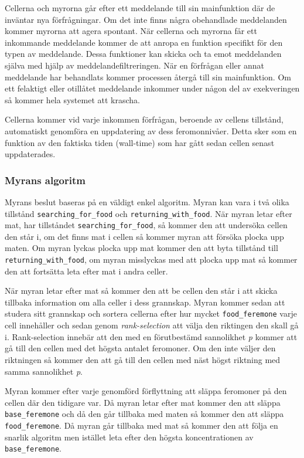 \documentclass[12pt]{article}
\begin{document}
Cellerna och myrorna går efter ett meddelande till sin mainfunktion där de inväntar nya förfrågningar.
Om det inte finns några obehandlade meddelanden kommer myrorna att agera spontant.
När cellerna och myrorna får ett inkommande meddelande kommer de att anropa en funktion specifikt för den typen av meddelande.
Dessa funktioner kan skicka och ta emot meddelanden själva med hjälp av meddelandefiltreringen.
När en förfrågan eller annat meddelande har behandlats kommer processen återgå till sin mainfunktion.
Om ett felaktigt eller otillåtet meddelande inkommer under någon del av exekveringen så kommer hela systemet att krascha.

Cellerna kommer vid varje inkommen förfrågan,
beroende av cellens tillstånd,
automatiskt genomföra en uppdatering av dess feromonnivåer.
Detta sker som en funktion av den faktiska tiden (wall-time) som har gått sedan cellen senast uppdaterades.

\subsubsection{Myrans algoritm}
Myrans beslut baseras på en väldigt enkel algoritm.
Myran kan vara i två olika tillstånd \texttt{searching\_for\_food} och \texttt{returning\_with\_food}.
När myran letar efter mat, har tillståndet \texttt{searching\_for\_food}, så kommer den att undersöka cellen den står i,
om det finns mat i cellen så kommer myran att försöka plocka upp maten.
Om myran lyckas plocka upp mat kommer den att byta tillstånd till \texttt{returning\_with\_food},
om myran misslyckas med att plocka upp mat så kommer den att fortsätta leta efter mat i andra celler.

När myran letar efter mat så kommer den att be cellen den står i att skicka tillbaka information om alla celler i dess grannskap.
Myran kommer sedan att studera sitt grannskap och sortera cellerna efter hur mycket \texttt{food\_feremone} varje cell innehåller och sedan genom \textit{rank-selection} att välja den riktingen den skall gå i.
Rank-selection innebär att den med en förutbestämd sannolikhet \textit{p} kommer att gå till den cellen med det högsta antalet feromoner.
Om den inte väljer den riktningen så kommer den att gå till den cellen med näst högst riktning med samma sannolikhet \textit{p}.

Myran kommer efter varje genomförd förflyttning att släppa feromoner på den cellen där den tidigare var.
Då myran letar efter mat kommer den att släppa \texttt{base\_feremone} och då den går tillbaka med maten så kommer den att släppa \texttt{food\_feremone}.
Då myran går tillbaka med mat så kommer den att följa en snarlik algoritm men istället leta efter den högsta koncentrationen av \texttt{base\_feremone}.
\end{document}
